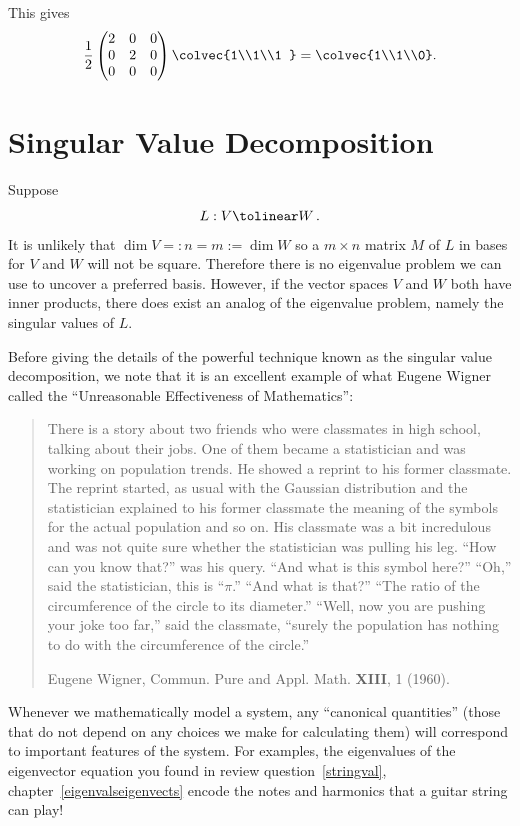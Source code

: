 \begin{example}
This gives 
\[\frac12 \begin{pmatrix}
 2 & 0 &0 \\
0 & 2  &0\\
0 & 0 &0
\end{pmatrix}
\colvec{1\\1\\1 } = \colvec{1\\1\\0} .\]
\end{example}



\section{Singular Value Decomposition}

Suppose 
\[
L:V\tolinear W\, .
\]
It is unlikely that $\dim V=:n=m:=\dim W$ so a $m\times n$ matrix $M$ of $L$ in bases for $V$ and $W$ will not be square.
Therefore there is no eigenvalue problem  we can use to uncover a preferred basis. However, if the vector spaces $V$ and 
$W$ both have inner products, there does exist an analog of the eigenvalue problem, namely the singular values of $L$.

Before giving the details of the powerful technique known as the singular value decomposition, we note that it is an 
excellent example of what Eugene Wigner called the ``Unreasonable Effectiveness of Mathematics'':
\begin{quote}{\scriptsize
There is a story about two friends who were classmates in high school, talking about their jobs. One of them became a statistician
and was working on population trends. He showed a reprint to his former classmate.
The reprint started, as usual with the Gaussian distribution and the statistician explained
to his former classmate the meaning of the symbols for the actual population and so on. His classmate
was a bit incredulous and was not quite sure whether the statistician was pulling his leg. ``How can you 
know that?'' was his query. ``And what is this symbol here?'' ``Oh,'' said the statistician, this is ``$\pi$.''
``And what is that?'' ``The ratio of the circumference of the circle to its diameter.'' ``Well, now
you are pushing your joke too far,'' said the classmate, ``surely the population has nothing to do with the 
circumference of the circle.''


Eugene Wigner, Commun. Pure and Appl. Math. {\bfseries XIII}, 1 (1960).
}
\end{quote}
Whenever we mathematically model a system, any ``canonical quantities'' 
(those that  %
do not
depend on any choices we make for calculating them) will correspond to important features of the system. For examples, the eigenvalues
of the eigenvector equation you found in review question~\ref{stringval}, chapter~\ref{eigenvalseigenvects} encode the notes and harmonics that a guitar string can play! 

